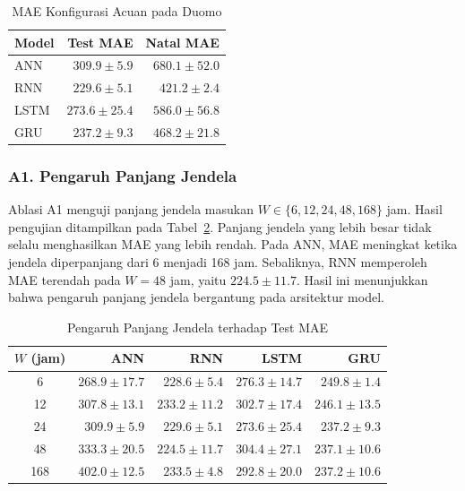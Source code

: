 \documentclass[conference,a4paper]{IEEEtran}
\begin{document}
\begin{table}[!t]
    \centering
    \caption{MAE Konfigurasi Acuan pada Duomo}
    \label{tab:baseline}
    \footnotesize
    \begin{tabular}{lrr}
        \toprule
        Model & Test MAE & Natal MAE \\
        \midrule
        ANN  & $309.9 \pm 5.9$ & $680.1 \pm 52.0$ \\
        RNN  & $229.6 \pm 5.1$ & $421.2 \pm 2.4$ \\
        LSTM & $273.6 \pm 25.4$ & $586.0 \pm 56.8$ \\
        GRU  & $237.2 \pm 9.3$ & $468.2 \pm 21.8$ \\
        \bottomrule
    \end{tabular}
\end{table}

\subsubsection{A1. Pengaruh Panjang Jendela}

Ablasi A1 menguji panjang jendela masukan
$W \in \{6,12,24,48,168\}$ jam. Hasil pengujian
ditampilkan pada Tabel~\ref{tab:ablasi-w}. Panjang
jendela yang lebih besar tidak selalu menghasilkan
MAE yang lebih rendah. Pada ANN, MAE meningkat ketika
jendela diperpanjang dari 6 menjadi 168 jam. Sebaliknya,
RNN memperoleh MAE terendah pada $W=48$ jam, yaitu
$224.5 \pm 11.7$. Hasil ini menunjukkan bahwa pengaruh
panjang jendela bergantung pada arsitektur model.

\begin{table}[!t]
    \centering
    \caption{Pengaruh Panjang Jendela terhadap Test MAE}
    \label{tab:ablasi-w}
    \footnotesize
    \begin{tabular}{crrrr}
        \toprule
        $W$ (jam) & ANN & RNN & LSTM & GRU \\
        \midrule
        6 & $268.9 \pm 17.7$ & $228.6 \pm 5.4$ &
        $276.3 \pm 14.7$ & $249.8 \pm 1.4$ \\
        12 & $307.8 \pm 13.1$ & $233.2 \pm 11.2$ &
        $302.7 \pm 17.4$ & $246.1 \pm 13.5$ \\
        24 & $309.9 \pm 5.9$ & $229.6 \pm 5.1$ &
        $273.6 \pm 25.4$ & $237.2 \pm 9.3$ \\
        48 & $333.3 \pm 20.5$ & $224.5 \pm 11.7$ &
        $304.4 \pm 27.1$ & $237.1 \pm 10.6$ \\
        168 & $402.0 \pm 12.5$ & $233.5 \pm 4.8$ &
        $292.8 \pm 20.0$ & $237.2 \pm 10.6$ \\
        \bottomrule
    \end{tabular}
\end{table}
\end{document}
